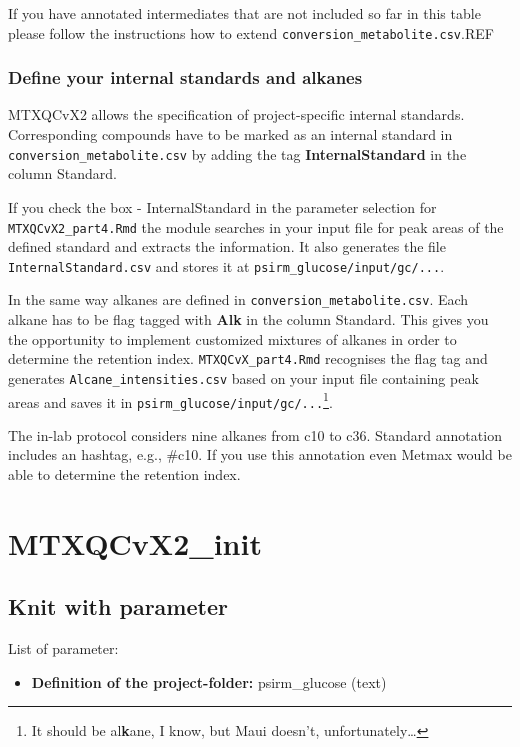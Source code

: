 \documentclass[]{book}
\providecommand{\tightlist}{%
  \setlength{\itemsep}{0pt}\setlength{\parskip}{0pt}}
\let\rmarkdownfootnote\footnote%
\def\footnote{\protect\rmarkdownfootnote}
\theoremstyle{definition}
\theoremstyle{definition}
\theoremstyle{definition}
\theoremstyle{remark}
\begin{document}
If you have annotated intermediates that are not included so far in this
table please follow the instructions how to extend
\texttt{conversion\_metabolite.csv}.REF

\subsection{Define your internal standards and
alkanes}\label{define-your-internal-standards-and-alkanes}

MTXQCvX2 allows the specification of project-specific internal
standards. Corresponding compounds have to be marked as an internal
standard in \texttt{conversion\_metabolite.csv} by adding the tag
\textbf{InternalStandard} in the column Standard.

If you check the box - InternalStandard in the parameter selection for
\texttt{MTXQCvX2\_part4.Rmd} the module searches in your input file for
peak areas of the defined standard and extracts the information. It also
generates the file \texttt{InternalStandard.csv} and stores it at
\texttt{psirm\_glucose/input/gc/...}.

In the same way alkanes are defined in
\texttt{conversion\_metabolite.csv}. Each alkane has to be flag tagged
with \textbf{Alk} in the column Standard. This gives you the opportunity
to implement customized mixtures of alkanes in order to determine the
retention index. \texttt{MTXQCvX\_part4.Rmd} recognises the flag tag and
generates \texttt{Alcane\_intensities.csv} based on your input file
containing peak areas and saves it in
\texttt{psirm\_glucose/input/gc/...}\footnote{It should be
  al\textbf{k}ane, I know, but Maui doesn't, unfortunately\ldots{}}.

The in-lab protocol considers nine alkanes from c10 to c36. Standard
annotation includes an hashtag, e.g., \#c10. If you use this annotation
even Metmax would be able to determine the retention index.

\chapter{MTXQCvX2\_init}\label{init}

\section{Knit with parameter}\label{knit-with-parameter}

List of parameter:

\begin{itemize}
\tightlist
\item
  \textbf{Definition of the project-folder:} psirm\_glucose (text)
\end{itemize}
\end{document}
